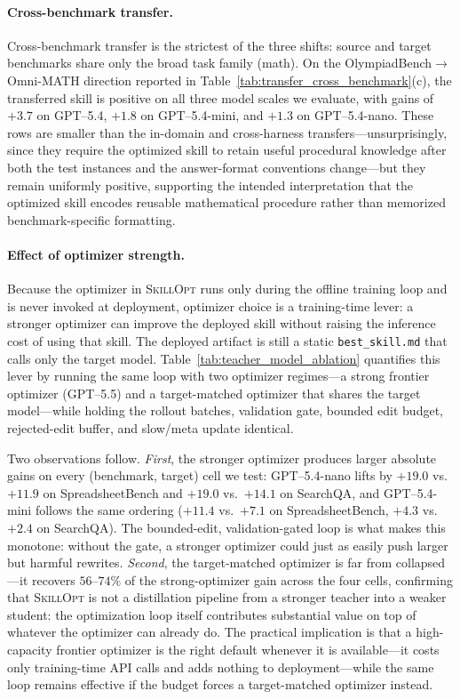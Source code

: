 \documentclass{llmxive}
\providecommand{\ourmethod}{\textsc{SkillOpt}\xspace}
\begin{document}
\paragraph{Cross-benchmark transfer.}
Cross-benchmark transfer is the strictest of the three shifts: source and target benchmarks share only the broad task family (math). On the OlympiadBench$\to$Omni-MATH direction reported in Table~\ref{tab:transfer_cross_benchmark}(c), the transferred skill is positive on all three model scales we evaluate, with gains of $+3.7$ on GPT--5.4, $+1.8$ on GPT--5.4-mini, and $+1.3$ on GPT--5.4-nano. These rows are smaller than the in-domain and cross-harness transfers---unsurprisingly, since they require the optimized skill to retain useful procedural knowledge after both the test instances and the answer-format conventions change---but they remain uniformly positive, supporting the intended interpretation that the optimized skill encodes reusable mathematical procedure rather than memorized benchmark-specific formatting.

\paragraph{Effect of optimizer strength.}
Because the optimizer in \ourmethod{} runs only during the offline training loop and is never invoked at deployment, optimizer choice is a training-time lever: a stronger optimizer can improve the deployed skill without raising the inference cost of using that skill. The deployed artifact is still a static \texttt{best\_skill.md} that calls only the target model. Table~\ref{tab:teacher_model_ablation} quantifies this lever by running the same loop with two optimizer regimes---a strong frontier optimizer (GPT--5.5) and a target-matched optimizer that shares the target model---while holding the rollout batches, validation gate, bounded edit budget, rejected-edit buffer, and slow/meta update identical.

Two observations follow. \emph{First}, the stronger optimizer produces larger absolute gains on every (benchmark, target) cell we test: GPT--5.4-nano lifts by $+19.0$ vs.\ $+11.9$ on SpreadsheetBench and $+19.0$ vs.\ $+14.1$ on SearchQA, and GPT--5.4-mini follows the same ordering ($+11.4$ vs.\ $+7.1$ on SpreadsheetBench, $+4.3$ vs.\ $+2.4$ on SearchQA). The bounded-edit, validation-gated loop is what makes this monotone: without the gate, a stronger optimizer could just as easily push larger but harmful rewrites. \emph{Second}, the target-matched optimizer is far from collapsed---it recovers $56$--$74\%$ of the strong-optimizer gain across the four cells, confirming that \ourmethod{} is not a distillation pipeline from a stronger teacher into a weaker student: the optimization loop itself contributes substantial value on top of whatever the optimizer can already do. The practical implication is that a high-capacity frontier optimizer is the right default whenever it is available---it costs only training-time API calls and adds nothing to deployment---while the same loop remains effective if the budget forces a target-matched optimizer instead.
\end{document}
